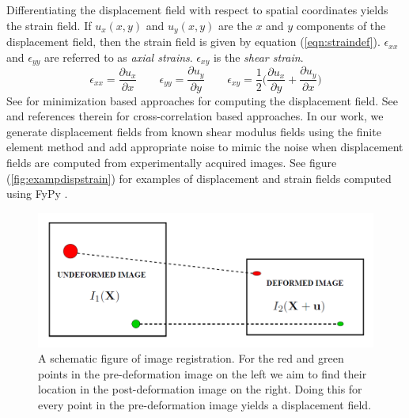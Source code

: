 \documentclass[12pt]{article}
\newcommand{\beq}{\begin{equation}}
\newcommand{\eeq}{\end{equation}}
\newcommand{\pdd}[2]{\frac{\partial{{#1}}}{\partial{#2}}}
\begin{document}
Differentiating the displacement field with respect to spatial coordinates yields the strain field. If $u_x(x,y)$ and $u_{y}(x,y)$ are the $x$ and $y$ components of the displacement field, then the strain field is given by equation (\ref{eqn:straindef}). $\epsilon_{xx}$ and $\epsilon_{yy}$ are referred to as \textit{axial strains}. $\epsilon_{xy}$ is the \textit{shear strain}.
\beq
\label{eqn:straindef}
\epsilon_{xx} = \pdd{u_{x}}{x} \qquad \epsilon_{yy} = \pdd{u_{y}}{y} \qquad \epsilon_{xy} = \frac{1}{2}\Big(\pdd{u_{x}}{y} + \pdd{u_{y}}{x}\Big)
\eeq
See \cite{paper:richards2009,paper:gokhale2004,paper:pellot-barakat2004} for minimization based approaches for computing the displacement field. See \cite{paper:ophir1991,paper:ophir1996,paper:alam1998} and references therein for cross-correlation based approaches. In our work, we generate displacement fields from known shear modulus fields using the finite element method \cite{book:hugheslinear,book:fishbelytschko} and add appropriate noise to mimic the noise when displacement fields are computed from experimentally acquired images. See figure (\ref{fig:exampdispstrain}) for examples of displacement and strain fields computed using FyPy \cite{misc:fypy}.
%
\begin{figure}[!h]
  \centering
  \includegraphics[totalheight=4cm]{Figures/regist.png}
  \caption{\label{fig:registschematic} A schematic figure of image registration. For the red and green points in the pre-deformation image on the left we aim to find their location in the post-deformation image on the right. Doing this for every point in the pre-deformation image yields a displacement field.}
\end{figure}
%
\end{document}
